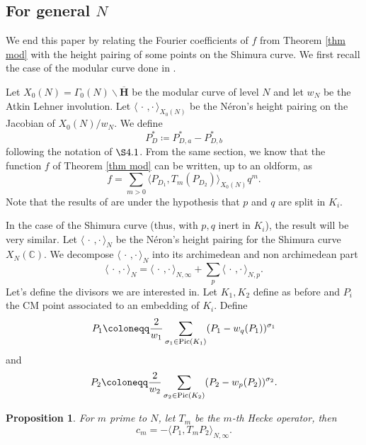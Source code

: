 \documentclass[a4paper,12pt]{article}
\newtheorem{proposition}[theorem]{Proposition}
\newcommand{\CC}{\mathbb{C}}
\begin{document}
\subsection{\texorpdfstring{For general $N$}{For general N}}
We end this paper by relating the Fourier coefficients of $f$ from Theorem \ref{thm mod} with the height pairing of some points on the Shimura curve. We first recall the case of the modular curve done in \cite{GrossKohnenZagier87}.
\par
Let $X_0(N)=\Gamma_0(N)\backslash\overline{\mathbf{H}}$ be the modular curve of level $N$ and let $w_N$ be the Atkin Lehner involution. Let
$\langle\,\cdot \, , \cdot \, \rangle_{X_0(N)}$ be the Néron's height pairing on the Jacobian of $X_0(N)/w_N$.
We define \[P_D^*\coloneqq P_{D,a}^*-P_{D,b}^*\]
following the notation of \cite{GrossKohnenZagier87} $\S4.1$.
From the same section, we know that the function $f$ of Theorem \ref{thm mod} can be written, up to an oldform, as
\begin{equation}\label{GKZ heights}
    f=\sum_{m>0}\langle P_{D_1},T_m(P_{D_2})\rangle_{X_0(N)} q^m.
\end{equation}
Note that the results of \cite{GrossKohnenZagier87} are under the hypothesis that $p$ and $q$ are split in $K_i$. 
\par
In the case of the Shimura curve (thus, with $p,q$ inert in $K_i$), the result will be very similar. Let $\langle\,\cdot \, , \cdot \, \rangle_N$ be the Néron's height pairing for the Shimura curve $X_N(\CC)$. We decompose $\langle\,\cdot \, , \cdot \, \rangle_N$ into its archimedean and non archimedean part
\[\langle\,\cdot \, , \cdot \, \rangle_N=\langle\,\cdot \, , \cdot \, \rangle_{N,\infty}+\sum_{p}\langle\,\cdot \, , \cdot \, \rangle_{N,p}.\]
Let's define the divisors we are interested in.
Let $K_1,K_2$ define as before and $P_i$ the CM point associated to an embedding of $K_i$. Define
 \[P_1\coloneqq \frac{2}{w_1}\sum_{\sigma_1\in\textup{Pic}(K_1)}(P_1-w_q(P_1))^{\sigma_1}\]
 and
\[P_2\coloneqq \frac{2}{w_2}\sum_{\sigma_2\in\textup{Pic}(K_2)}(P_2-w_p(P_2))^{\sigma_2}.\]
\begin{proposition}  For $m $ prime to $N$, let $T_m$ be the $m$-th Hecke operator, then
\begin{equation}
c_m=-\langle P_1,T_mP_2\rangle _{N,\infty}.
\end{equation}
\end{proposition}
\end{document}
